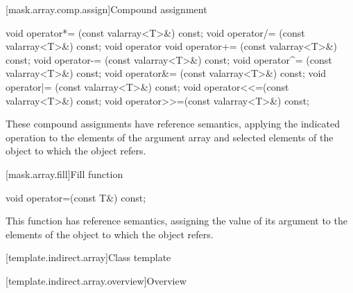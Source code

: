 [mask.array.comp.assign]{Compound assignment}

%
%
%
%
%
%
%
%
%
%
\begin{itemdecl}
void operator*= (const valarray<T>&) const;
void operator/= (const valarray<T>&) const;
void operator%
void operator+= (const valarray<T>&) const;
void operator-= (const valarray<T>&) const;
void operator^= (const valarray<T>&) const;
void operator&= (const valarray<T>&) const;
void operator|= (const valarray<T>&) const;
void operator<<=(const valarray<T>&) const;
void operator>>=(const valarray<T>&) const;
\end{itemdecl}

\begin{itemdescr}
\pnum
These compound assignments have reference semantics, applying the
indicated operation to the elements of the argument array and selected elements
of the
object to which the  object refers.
\end{itemdescr}

[mask.array.fill]{Fill function}

%
\begin{itemdecl}
void operator=(const T&) const;
\end{itemdecl}

\begin{itemdescr}
\pnum
This function has reference semantics, assigning the value of its
argument to the elements of the
object to which the
object refers.
\end{itemdescr}

[template.indirect.array]{Class template }

[template.indirect.array.overview]{Overview}

